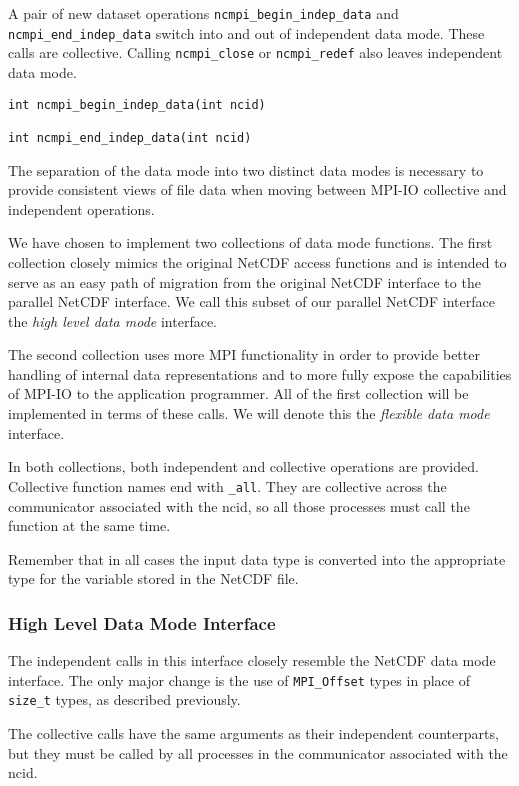 \documentclass[10pt]{article}
\begin{document}
A pair of new dataset operations \texttt{ncmpi\_begin\_indep\_data} and
\texttt{ncmpi\_end\_indep\_data} switch into and out of independent data mode.
These calls are collective.  Calling \texttt{ncmpi\_close} or
\texttt{ncmpi\_redef} also leaves independent data mode.

\begin{verbatim}
int ncmpi_begin_indep_data(int ncid)

int ncmpi_end_indep_data(int ncid)
\end{verbatim}

The separation of the data mode into two distinct data modes is necessary to
provide consistent views of file data when moving between MPI-IO collective
and independent operations.

We have chosen to implement two collections of data mode functions.  The first
collection closely mimics the original NetCDF access functions and is intended
to serve as an easy path of migration from the original NetCDF interface to
the parallel NetCDF interface.  We call this subset of our parallel NetCDF
interface the \emph{high level data mode} interface.

The second collection uses more MPI functionality in order to provide better
handling of internal data representations and to more fully expose the
capabilities of MPI-IO to the application programmer.  All of the first
collection will be implemented in terms of these calls.  We will denote this
the \emph{flexible data mode} interface.

In both collections, both independent and collective operations are provided.
Collective function names end with \texttt{\_all}.  They are collective across
the communicator associated with the ncid, so all those processes must call
the function at the same time.

Remember that in all cases the input data type is converted into the
appropriate type for the variable stored in the NetCDF file.

\subsubsection{High Level Data Mode Interface}

The independent calls in this interface closely resemble the NetCDF data mode
interface.  The only major change is the use of \texttt{MPI\_Offset} types in
place of \texttt{size\_t} types, as described previously.

The collective calls have the same arguments as their independent
counterparts, but they must be called by all processes in the communicator
associated with the ncid.
\end{document}
